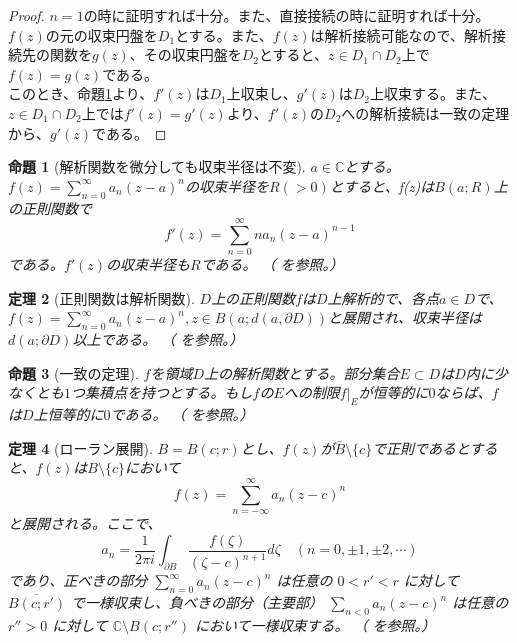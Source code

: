 \documentclass[paper=a4, fontsize=11pt]{jlreq} %
\theoremstyle{break}
\newtheorem{theorem}{定理}[section]
\newtheorem{proposition}[theorem]{命題}
\theoremstyle{qa}
\theoremstyle{remark} %
\begin{document}
\begin{proof}
    $n=1$の時に証明すれば十分。また、直接接続の時に証明すれば十分。\\
    $f(z)$の元の収束円盤を$D_{1}$とする。また、$f(z)$は解析接続可能なので、解析接続先の関数を$g(z)$、その収束円盤を$D_{2}$とすると、$z \in D_{1}\cap D_{2}$上で$f(z)=g(z)$である。\\
    このとき、命題\ref{prop:convergence-radius-invariant}より、$f'(z)はD_{1}$上収束し、$g'(z)はD_{2}$上収束する。また、$z \in D_{1}\cap D_{2}$上では$f'(z)=g'(z)$より、$f'(z)$の$D_{2}$への解析接続は一致の定理から、$g'(z)$である。
\end{proof}
\begin{proposition}[解析関数を微分しても収束半径は不変]\label{prop:convergence-radius-invariant}
    $a\in\mathbb{C}$とする。$f(z)=\sum_{n=0}^{\infty}a_{n}(z-a)^{n}$の収束半径を$R(>0)$とすると、f(z)は$B(a;R)$上の正則関数で
    \[
    f'(z)=\sum_{n=0}^{\infty}na_{n}(z-a)^{n-1}
    \]
    である。$f'(z)$の収束半径も$R$である。
    （\cite[p.62 定理3.1.10]{book:noguchi} を参照。）
\end{proposition}
\begin{theorem}[正則関数は解析関数]\label{thm:holomorphic-is-analytic}
    $D$上の正則関数$f$は$D$上解析的で、各点$a\in D$で、$f(z)=\sum_{n=0}^{\infty}a_{n}(z-a)^{n}, z\in B(a;d(a,\partial D))$と展開され、収束半径は$d(a;\partial D)$以上である。
    （\cite[p.89 定理3.5.7]{book:noguchi} を参照。）
\end{theorem}
\begin{proposition}[一致の定理]\label{prop:identity_theorem}
    $f$を領域$D$上の解析関数とする。部分集合$E\subset D$は$D$内に少なくとも$1$つ集積点を持つとする。もし$f$の$E$への制限$f|_{E}$が恒等的に$0$ならば、$f$は$D$上恒等的に$0$である。
    （\cite[p.35 定理2.4.14]{book:noguchi} を参照。）
\end{proposition}
\begin{theorem}[ローラン展開]\label{thm:laurent_expansion}
    $B=B(c;r)$とし、$f(z)$が$\bar{B}\setminus\{c\}$で正則であるとすると、$f(z)$は$B\setminus\{c\}$において
    \[
    f(z)=\sum_{n=-\infty}^{\infty}a_{n}(z-c)^{n}
    \]
    と展開される。ここで、
    \[
    a_{n}=\frac{1}{2\pi i}\int_{\partial B}\frac{f(\zeta)}{(\zeta-c)^{n+1}}d\zeta\quad (n=0,\pm1,\pm2,\cdots)
    \]
    であり、正べきの部分 $\sum_{n=0}^{\infty}a_{n}(z-c)^{n}$ は任意の $0<r'<r$ に対して $\overline{B(c;r')}$ で一様収束し、負べきの部分（主要部） $\sum_{n<0}a_{n}(z-c)^{n}$ は任意の $r''>0$ に対して $\mathbb{C}\setminus B(c;r'')$ において一様収束する。
    （\cite[p.70 定理14.1]{book:kimura} を参照。）
\end{theorem}
\end{document}
